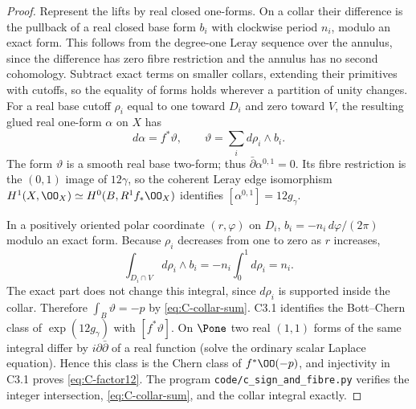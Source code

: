 \begin{proof}
Represent the lifts by real closed one-forms.  On a collar their
difference is the pullback of a real closed base form $b_i$ with
clockwise period $n_i$, modulo an exact form.  This follows from the
degree-one Leray sequence over the annulus, since the difference has
zero fibre restriction and the annulus has no second cohomology.
Subtract exact terms on smaller collars, extending their primitives
with cutoffs, so the equality of forms holds wherever a partition of
unity changes.  For a real base cutoff $\rho_i$ equal to one toward
$D_i$ and zero toward $V$, the resulting glued real one-form $\alpha$
on $X$ has
\[
d\alpha=f^*\vartheta,\qquad
\vartheta=\sum_i d\rho_i\wedge b_i.
\]
The form $\vartheta$ is a smooth real base two-form; thus
$\bar\partial\alpha^{0,1}=0$.  Its fibre restriction is the
$(0,1)$ image of $12\gamma$, so the coherent Leray edge isomorphism
$H^1(X,\OO_X)\simeq H^0(B,R^1f_*\OO_X)$ identifies
$[\alpha^{0,1}]=12g_\gamma$.

In a positively oriented polar coordinate $(r,\varphi)$ on $D_i$,
$b_i=-n_i\,d\varphi/(2\pi)$ modulo an exact form.
Because $\rho_i$ decreases from one to zero as $r$ increases,
\[
\int_{D_i\cap V}d\rho_i\wedge b_i
=-n_i\int_0^1d\rho_i=n_i.
\]
The exact part does not change this integral, since $d\rho_i$ is
supported inside the collar.  Therefore
$\int_B\vartheta=-p$ by \eqref{eq:C-collar-sum}.  C3.1 identifies
the Bott--Chern class of $\exp(12g_\gamma)$ with $[f^*\vartheta]$.
On $\Pone$ two real $(1,1)$ forms of the same integral differ by
$i\partial\bar\partial$ of a real function (solve the ordinary
scalar Laplace equation).  Hence this class is the Chern class of
$f^*\OO(-p)$, and injectivity in C3.1 proves
\eqref{eq:C-factor12}.  The program
\texttt{code/c\_sign\_and\_fibre.py} verifies the integer
intersection, \eqref{eq:C-collar-sum}, and the collar integral exactly.
\end{proof}
